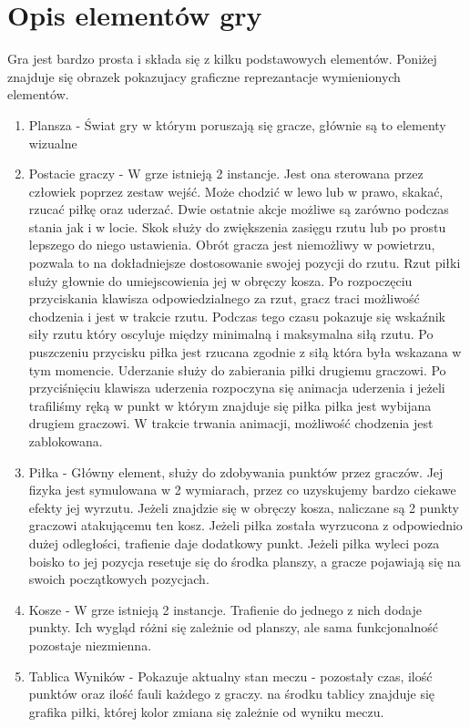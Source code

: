 \documentclass[a4paper,12pt,twoside,openany]{report}
\begin{document}
\section{Opis elementów gry}

Gra jest bardzo prosta i składa się z kilku podstawowych elementów.
Poniżej znajduje się obrazek pokazujacy graficzne reprezantacje wymienionych elementów.
\begin{enumerate}
    \item Plansza - Świat gry w którym poruszają się gracze, głównie są to elementy wizualne
    \item Postacie graczy - W grze istnieją 2 instancje. Jest ona sterowana przez człowiek poprzez zestaw wejść. Może chodzić w lewo lub w prawo, skakać, rzucać piłkę oraz uderzać. Dwie ostatnie akcje możliwe są zarówno podczas stania jak i w locie. Skok służy do zwiększenia zasięgu rzutu lub po prostu lepszego do niego ustawienia. Obrót gracza jest niemożliwy w powietrzu, pozwala to na dokładniejsze dostosowanie swojej pozycji do rzutu. Rzut piłki służy głownie do umiejscowienia jej w obręczy kosza. Po rozpoczęciu przyciskania klawisza odpowiedzialnego za rzut, gracz traci możliwość chodzenia i jest w trakcie rzutu. Podczas tego czasu pokazuje się wskaźnik siły rzutu który oscyluje między minimalną i maksymalna siłą rzutu. Po puszczeniu przycisku piłka jest rzucana zgodnie z siłą która była wskazana w tym momencie. Uderzanie służy do zabierania piłki drugiemu graczowi. Po przyciśnięciu klawisza uderzenia rozpoczyna się animacja uderzenia i jeżeli trafiliśmy ręką w punkt w którym znajduje się piłka piłka jest wybijana drugiem graczowi. W trakcie trwania animacji, możliwość chodzenia jest zablokowana.
    \item Piłka - Główny element, służy do zdobywania punktów przez graczów. Jej fizyka jest symulowana w 2 wymiarach, przez co uzyskujemy bardzo ciekawe efekty jej wyrzutu. Jeżeli znajdzie się w obręczy kosza, naliczane są 2 punkty graczowi atakującemu ten kosz. Jeżeli piłka została wyrzucona z odpowiednio dużej odległości, trafienie daje dodatkowy punkt. Jeżeli piłka wyleci poza boisko to jej pozycja resetuje się do środka planszy, a gracze pojawiają się na swoich początkowych pozycjach.
    \item Kosze -  W grze istnieją 2 instancje. Trafienie do jednego z nich dodaje punkty. Ich wygląd różni się zależnie od planszy, ale sama funkcjonalność pozostaje niezmienna.
    \item Tablica Wyników - Pokazuje aktualny stan meczu - pozostały czas, ilość punktów oraz ilość fauli każdego z graczy. na środku tablicy znajduje się grafika piłki, której kolor zmiana się zależnie od wyniku meczu.
\end{enumerate}
\end{document}
